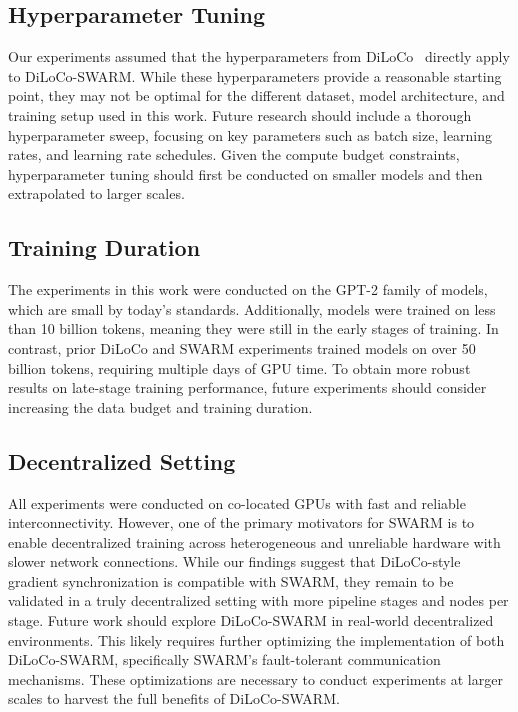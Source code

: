 \documentclass{article}
\begin{document}
\subsection{Hyperparameter Tuning}

Our experiments assumed that the hyperparameters from DiLoCo~\cite{douillard2023diloco} directly apply to DiLoCo-SWARM. While these hyperparameters provide a reasonable starting point, they may not be optimal for the different dataset, model architecture, and training setup used in this work. Future research should include a thorough hyperparameter sweep, focusing on key parameters such as batch size, learning rates, and learning rate schedules. Given the compute budget constraints, hyperparameter tuning should first be conducted on smaller models and then extrapolated to larger scales.

\subsection{Training Duration}

The experiments in this work were conducted on the GPT-2 family of models, which are small by today's standards. Additionally, models were trained on less than 10 billion tokens, meaning they were still in the early stages of training. In contrast, prior DiLoCo and SWARM experiments trained models on over 50 billion tokens, requiring multiple days of GPU time. To obtain more robust results on late-stage training performance, future experiments should consider increasing the data budget and training duration.

\subsection{Decentralized Setting}

All experiments were conducted on co-located GPUs with fast and reliable interconnectivity. However, one of the primary motivators for SWARM is to enable decentralized training across heterogeneous and unreliable hardware with slower network connections. While our findings suggest that DiLoCo-style gradient synchronization is compatible with SWARM, they remain to be validated in a truly decentralized setting with more pipeline stages and nodes per stage. Future work should explore DiLoCo-SWARM in real-world decentralized environments. This likely requires further optimizing the implementation of both DiLoCo-SWARM, specifically SWARM's fault-tolerant communication mechanisms. These optimizations are necessary to conduct experiments at larger scales to harvest the full benefits of DiLoCo-SWARM.
\end{document}

